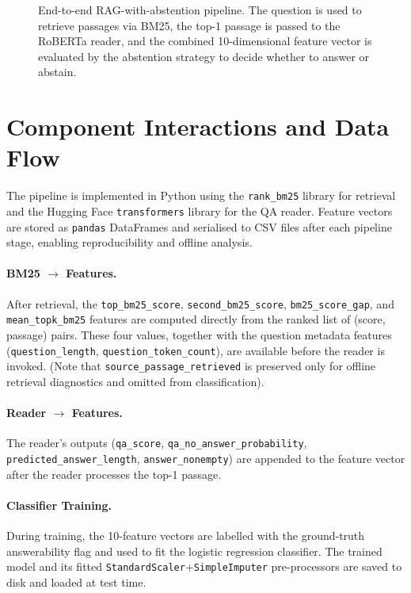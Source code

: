 \begin{figure}[htbp]
\begin{tikzpicture}
  \end{tikzpicture}
  \caption{End-to-end RAG-with-abstention pipeline. The question is used to
           retrieve passages via BM25, the top-1 passage is passed to the
           RoBERTa reader, and the combined 10-dimensional feature vector is
           evaluated by the abstention strategy to decide whether to answer or
           abstain.}
  \label{fig:architecture}
\end{figure}

\section{Component Interactions and Data Flow}
\label{sec:arch_dataflow}

The pipeline is implemented in Python using the \texttt{rank\_bm25} library for
retrieval and the Hugging Face \texttt{transformers} library for the QA reader.
Feature vectors are stored as \texttt{pandas} DataFrames and serialised to CSV
files after each pipeline stage, enabling reproducibility and offline analysis.

\paragraph{BM25 $\rightarrow$ Features.}
After retrieval, the \texttt{top\_bm25\_score}, \texttt{second\_bm25\_score},
\texttt{bm25\_score\_gap}, and \texttt{mean\_topk\_bm25}
features are computed directly from the
ranked list of (score, passage) pairs. These four values, together with the
question metadata features (\texttt{question\_length}, \texttt{question\_token\_count}),
are available before the reader is invoked. (Note that \texttt{source\_passage\_retrieved}
is preserved only for offline retrieval diagnostics and omitted from classification).

\paragraph{Reader $\rightarrow$ Features.}
The reader's outputs (\texttt{qa\_score}, \texttt{qa\_no\_answer\_probability},
\texttt{predicted\_answer\_length}, \texttt{answer\_nonempty}) are appended to
the feature vector after the reader processes the top-1 passage.

\paragraph{Classifier Training.}
During training, the 10-feature vectors are labelled with the ground-truth
answerability flag and used to fit the logistic regression classifier. The
trained model and its fitted \texttt{StandardScaler}+\texttt{SimpleImputer}
pre-processors are saved to disk and loaded at test time.

